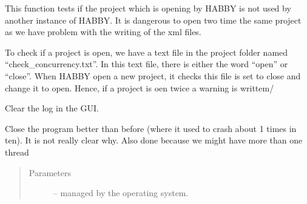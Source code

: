 \documentclass[letterpaper,10pt,english]{sphinxmanual}
\begin{document}
\begin{fulllineitems}
\begin{fulllineitems}
\end{fulllineitems}


\begin{fulllineitems}
\label{\detokenize{index:src_GUI.Main_windows_1.MainWindows.check_concurrency}}
This function tests if the project which is opening by HABBY is not used by another instance of HABBY. It is
dangerous  to open two time the same project as we have problem with the writing of the xml files.

To check if a project is open, we have a text file in the project folder named ``check\_concurrency.txt''.
In this text file, there is either the word ``open'' or ``close''. When HABBY open a new project, it checks
this file is set to close and change it to open. Hence, if a project is oen twice a warning is writtem/

\end{fulllineitems}


\begin{fulllineitems}
\label{\detokenize{index:src_GUI.Main_windows_1.MainWindows.clear_log}}
Clear the log in the GUI.

\end{fulllineitems}


\begin{fulllineitems}
\label{\detokenize{index:src_GUI.Main_windows_1.MainWindows.closeEvent}}
Close the program better than before (where it used to crash about 1 times in ten). It is not really clear why.
Also done because we might have more than one thread
\begin{quote}\begin{description}
\item[{Parameters}] \leavevmode
{} -- managed by the operating system.

\end{description}\end{quote}

\end{fulllineitems}


\end{fulllineitems}
\end{document}
